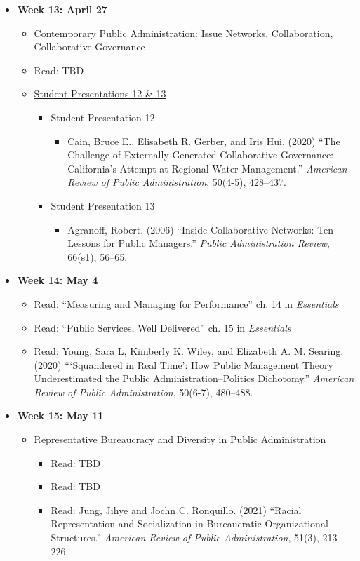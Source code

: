 \documentclass[11pt]{article}
\begin{document}
\begin{itemize}
	
	\item[] \textbf{Week 13: April 27} 
		\begin{itemize}
			\item Contemporary Public Administration: Issue Networks, Collaboration, Collaborative Governance
			\item Read: TBD
			\item \underline{Student Presentations 12 \& 13}
				\begin{itemize}
					\item Student Presentation 12
						\begin{itemize}
							\item Cain, Bruce E., Elisabeth R. Gerber, and Iris Hui. (2020) ``The Challenge of Externally Generated Collaborative Governance: California's Attempt at Regional Water Management.'' \emph{American Review of Public Administration}, 50(4-5), 428--437.
						\end{itemize}
					\item Student Presentation 13
						\begin{itemize}
							\item Agranoff, Robert. (2006) ``Inside Collaborative Networks: Ten Lessons for Public Managers.'' \emph{Public Administration Review}, 66(s1), 56--65.
						\end{itemize}
				\end{itemize}
		\end{itemize}
	
	\item[] \textbf{Week 14: May 4} 
	\begin{itemize}
		\item Read: ``Measuring and Managing for Performance'' ch. 14 in \emph{Essentials}
		\item Read: ``Public Services, Well Delivered'' ch. 15 in \emph{Essentials}
		\item Read: Young, Sara L, Kimberly K. Wiley, and Elizabeth A. M. Searing. (2020) ```Squandered in Real Time': How Public Management Theory Underestimated the Public Administration--Politics Dichotomy.'' \emph{American Review of Public Administration}, 50(6-7), 480--488.
	\end{itemize}
	
	\item[] \textbf{Week 15: May 11} 
	\begin{itemize}
		\item Representative Bureaucracy and Diversity in Public Administration
			\begin{itemize} 
				\item Read: TBD
				\item Read: TBD
				\item Read: Jung, Jihye and Jochn C. Ronquillo. (2021) ``Racial Representation and Socialization in Bureaucratic Organizational Structures.'' \emph{American Review of Public Administration}, 51(3), 213--226.
			\end{itemize}
		

\end{itemize}
\end{itemize}
\end{document}
